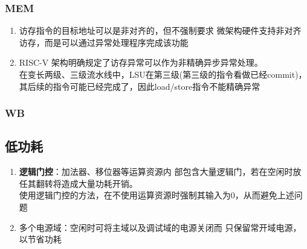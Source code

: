 \documentclass{article}
\begin{document}
\subsubsection{MEM}
\begin{enumerate}
  \item 访存指令的目标地址可以是非对齐的，但不强制要求 微架构硬件支持非对齐访存，而是可以通过异常处理程序完成该功能\cite{riscv1}
  \item RISC-V 架构明确规定了访存异常可以作为非精确异步异常处理。\\
    在变长两级、三级流水线中，LSU在第三级(第三级的指令看做已经commit)，
    其后续的指令可能已经完成了，因此load/store指令不能精确异常\cite{riscv1}
\end{enumerate}
\subsubsection{WB}
\subsection{低功耗}
\begin{enumerate}
  \item \textbf{逻辑门控}\cite{riscv1}：加法器、移位器等运算资源内 部包含大量逻辑门，若在空闲时放任其翻转将造成大量功耗开销。\\
   使用逻辑门控的方法，在不使用运算资源时强制其输入为0，从而避免上述问题
 \item 多个电源域\cite{riscv1}：空闲时可将主域以及调试域的电源关闭而
    只保留常开域电源，以节省功耗
\end{enumerate}
\end{document}
